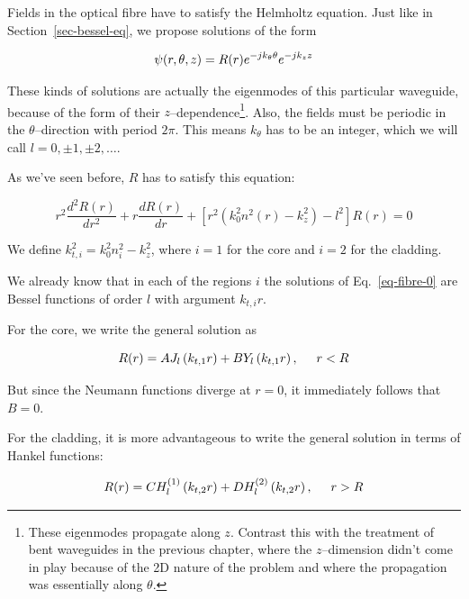 Fields in the optical fibre have to satisfy the Helmholtz equation. Just like in Section~\ref{sec-bessel-eq}, we propose solutions of the form 

\begin{equation}
\psi(r,\theta,z) = R(r)e^{-j k_\theta \theta }e^{-j k_z z} \\
\end{equation}  

These kinds of solutions are actually the eigenmodes of this particular waveguide, because of the form of their $z$--dependence\footnote{These eigenmodes propagate along $z$. Contrast this with the treatment of bent waveguides in the previous chapter, where the $z$--dimension didn't come in play because of the 2D nature of the problem and where the propagation was essentially along $\theta$.}.  Also, the fields must be periodic in the $\theta$--direction with period $2 \pi$. This means $k_\theta$ has to be an integer, which we will call $l = 0, \pm 1, \pm 2, \ldots$.

As we've seen before, $R$ has to satisfy this equation:

\begin{equation}
r^2\frac{d^2 R(r)}{d r^2} + r \frac{d R(r)}{d r} + \left[{r^2 \left(k_0^2 n^2(r) - k_z^2\right) - l^2}\right]R(r) = 0 \label{eq-fibre-0}
\end{equation} 

We define $k_{t,i}^2=k_0^2 n_i^2 - k_z^2$, where $i=1$ for the core and $i=2$ for the cladding.

We already know that in each of the regions $i$ the solutions of Eq.~\ref{eq-fibre-0} are Bessel functions of order $l$ with argument $k_{t,i} r$.

For the core, we write the general solution as

\begin{equation}
R(r) = A J_l\left(k_{t,1}r\right) + B Y_l\left(k_{t,1}r\right), \hspace{0.5 cm} r<R \label{eq-fibre-1}
\end{equation} 

But since the Neumann functions diverge at $r=0$, it immediately follows that $B=0$.

For the cladding, it is more advantageous to write the general solution in terms of Hankel functions:

\begin{equation}
R(r) = C H_l^{(1)}\left(k_{t,2}r\right) + D H_l^{(2)}\left(k_{t,2}r\right), \hspace{0.5 cm} r>R \label{eq-fibre-2}
\end{equation} 

